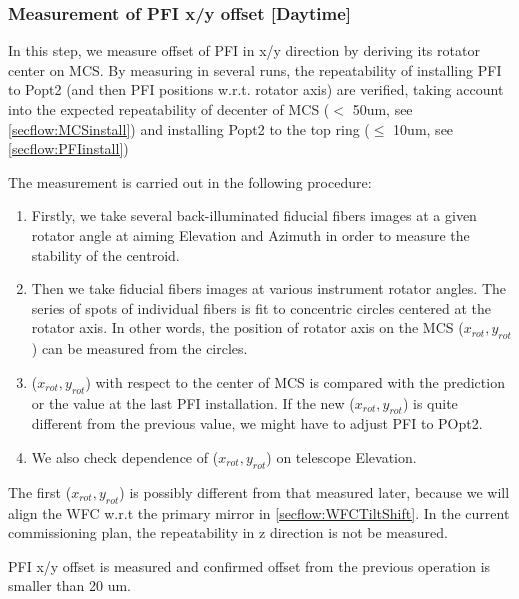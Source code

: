\subsubsection{Measurement of PFI x/y offset [Daytime]}\label{secflow:PFIoffset}

In this step, we measure offset of PFI in x/y direction by deriving its rotator center on MCS.
By measuring in several runs, the repeatability of installing PFI to Popt2 (and then PFI positions w.r.t. rotator axis) are verified, taking account into the expected repeatability of decenter of MCS ($<$ 50um, see \ref{secflow:MCSinstall}) and installing Popt2 to the top ring ($\leq$ 10um, see \ref{secflow:PFIinstall})

The measurement is carried out in the following procedure:
\begin{enumerate}
\item Firstly, we take several back-illuminated fiducial fibers images at a given rotator angle at aiming Elevation and Azimuth in order to measure the stability of the centroid.
\item Then we take fiducial fibers images at various instrument rotator angles.
The series of spots of individual fibers is fit to concentric circles centered at the rotator axis.
In other words, the position of rotator axis on the MCS ($x_{rot}, y_{rot}$) can be measured from the circles. 
\item ($x_{rot}, y_{rot}$) with respect to the center of MCS is compared with the prediction or the value at the last PFI installation. 
If the new ($x_{rot}, y_{rot}$) is quite different from the previous value, we might have to adjust PFI to POpt2.
\item We also check dependence of ($x_{rot}, y_{rot}$) on telescope Elevation.
\end{enumerate}

The first ($x_{rot}, y_{rot}$) is possibly different from that measured later, because we will align the WFC w.r.t the primary mirror in \ref{secflow:WFCTiltShift}.
In the current commissioning plan, the repeatability in z direction is not be measured.

\begin{itembox}[l]{}
PFI x/y offset is measured and confirmed offset from the previous operation is smaller than 20 um. 

\end{itembox}